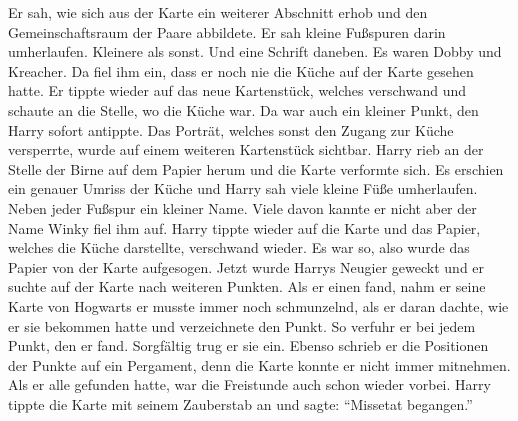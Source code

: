 Er sah, wie sich aus der Karte ein weiterer Abschnitt erhob und den Gemeinschaftsraum der Paare abbildete. Er sah kleine Fußspuren darin umherlaufen. Kleinere als sonst. Und eine Schrift daneben. Es waren Dobby und Kreacher.  Da fiel ihm ein, dass er noch nie die Küche auf der Karte gesehen hatte. Er tippte wieder auf das neue Kartenstück, welches verschwand und schaute an die Stelle, wo die Küche war. Da war auch ein kleiner Punkt, den Harry sofort antippte. Das Porträt, welches sonst den Zugang zur Küche versperrte, wurde auf einem weiteren Kartenstück sichtbar. Harry rieb an der Stelle der Birne auf dem Papier herum und die Karte verformte sich. Es erschien ein genauer Umriss der Küche und Harry sah viele kleine Füße umherlaufen. Neben jeder Fußspur ein kleiner Name. Viele davon kannte er nicht aber der Name Winky fiel ihm auf. Harry tippte wieder auf die Karte und das Papier, welches die Küche darstellte, verschwand wieder. Es war so, also wurde das Papier von der Karte aufgesogen. Jetzt wurde Harrys Neugier geweckt und er suchte auf der Karte nach weiteren Punkten. Als er einen fand, nahm er seine Karte von Hogwarts \gst er musste immer noch schmunzelnd, als er daran dachte, wie er sie bekommen hatte \gst und verzeichnete den Punkt. So verfuhr er bei jedem Punkt, den er fand. Sorgfältig trug er sie ein. Ebenso schrieb er die Positionen der Punkte auf ein Pergament, denn die Karte konnte er nicht immer mitnehmen.
Als er alle gefunden hatte, war die Freistunde auch schon wieder vorbei. Harry tippte die Karte mit seinem Zauberstab an und sagte: \enquote{Missetat begangen.}

